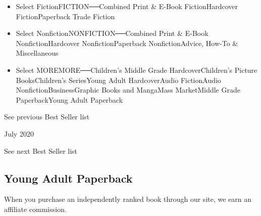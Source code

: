 \begin{itemize}
\tightlist
\item
  Select FictionFICTION──Combined Print \& E-Book FictionHardcover
  FictionPaperback Trade Fiction
\item
  Select NonfictionNONFICTION──Combined Print \& E-Book
  NonfictionHardcover NonfictionPaperback NonfictionAdvice, How-To \&
  Miscellaneous
\item
  Select MOREMORE──Children's Middle Grade HardcoverChildren's Picture
  BooksChildren's SeriesYoung Adult HardcoverAudio FictionAudio
  NonfictionBusinessGraphic Books and MangaMass MarketMiddle Grade
  PaperbackYoung Adult Paperback
\end{itemize}

\href{/books/best-sellers/2020/06/01/young-adult-paperback-monthly/}{}

See previous Best Seller list

July 2020

See next Best Seller list

\hypertarget{young-adult-paperback}{%
\subsection{Young Adult Paperback}\label{young-adult-paperback}}

When you purchase an independently ranked book through our site, we earn
an affiliate commission.

